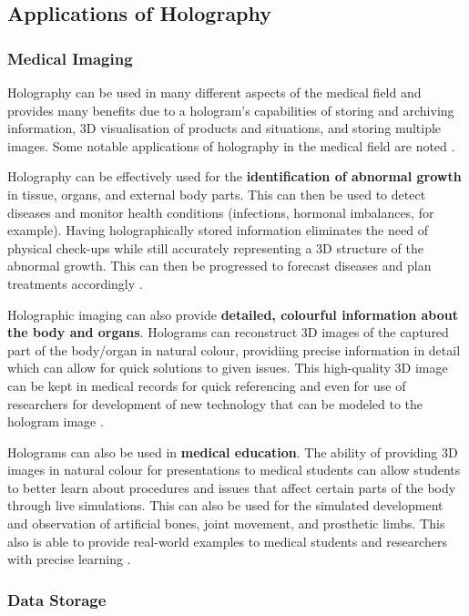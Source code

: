 \documentclass[12pt]{article}
\begin{document}
\subsection{Applications of Holography}

\subsubsection{Medical Imaging}

Holography can be used in many different aspects of the medical field and provides many benefits due to a hologram's capabilities of storing and archiving information, 3D visualisation of products and situations, and storing multiple images. Some notable applications of holography in the medical field are noted \cite{medholo}.

Holography can be effectively used for the \textbf{identification of abnormal growth} in tissue, organs, and external body parts. This can then be used to detect diseases and monitor health conditions (infections, hormonal imbalances, for example).
Having holographically stored information eliminates the need of physical check-ups while still accurately representing a 3D structure of the abnormal growth. This can then be progressed to forecast diseases and plan treatments accordingly \cite{medholo}.

Holographic imaging can also provide \textbf{detailed, colourful information about the body and organs}. Holograms can reconstruct 3D images of the captured part of the body/organ in natural colour, providiing precise information in detail which can allow for quick solutions to given issues.
This high-quality 3D image can be kept in medical records for quick referencing and even for use of researchers for development of new technology that can be modeled to the hologram image \cite{medholo}.

Holograms can also be used in \textbf{medical education}. The ability of providing 3D images in natural colour for presentations to medical students can allow students to better learn about procedures and issues that affect certain parts of the body through live simulations.
This can also be used for the simulated development and observation of artificial bones, joint movement, and prosthetic limbs. This also is able to provide real-world examples to medical students and researchers with precise learning \cite{medholo}.

\subsubsection{Data Storage}
\end{document}
